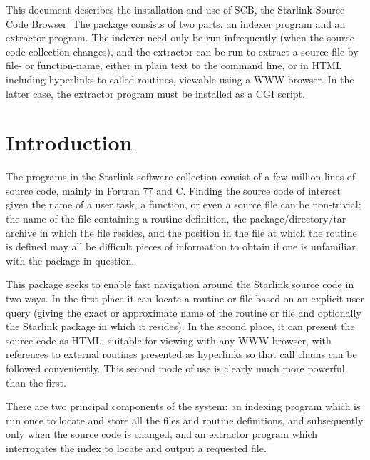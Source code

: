 \documentclass[twoside,11pt]{article}
\newcommand{\stardocinitials}  {SUN}
\newcommand{\stardocnumber}    {225.2}
\newcommand{\stardocabstract}  {
This document describes the installation and use of SCB,
the Starlink Source Code Browser.
The package consists of two parts, an indexer program and an
extractor program.
The indexer need only be run infrequently (when the source code collection
changes), and the extractor can be run to extract a source file
by file- or function-name, either in plain text to the command line,
or in HTML including hyperlinks to called routines, viewable
using a WWW browser.  In the latter case, the extractor program
must be installed as a CGI script.
}
\newcommand{\stardocname}{\stardocinitials /\stardocnumber}
\newenvironment{latexonly}{}{}
\newcommand{\xlabel}[1]{}
\renewcommand{\_}{\texttt{\symbol{95}}}
\renewcommand{\thepage}{\roman{page}}
\begin{document}
\stardocabstract
  \newpage
  \begin{latexonly}
    \setlength{\parskip}{0mm}
    \tableofcontents
    \setlength{\parskip}{\medskipamount}
    \markboth{\stardocname}{\stardocname}
  \end{latexonly}
\cleardoublepage
\renewcommand{\thepage}{\arabic{page}}
\setcounter{page}{1}


\section{\xlabel{sec:introduction}\label{sec:introduction}Introduction}

The programs in the Starlink software collection
consist of a few million lines of source code, mainly in
Fortran 77 and C.
Finding the source code of interest given the name of a
user task, a function, or even a source file can be non-trivial;
the name of the file containing a routine definition,
the package/directory/tar archive in which the file resides,
and the position in the file at which the routine is defined
may all be difficult pieces of information to obtain if one is
unfamiliar with the package in question.

This package seeks to enable fast navigation around the Starlink
source code in two ways.  In the first place it can locate a routine
or file based on an explicit user query (giving the exact or
approximate name of the routine or file and optionally the Starlink
package in which it resides).  In the second place, it can present
the source code as HTML, suitable for viewing with any WWW browser,
with references to external routines presented as hyperlinks so
that call chains can be followed conveniently.
This second mode of use is clearly much more powerful than the first.

There are two principal components of the system: an indexing program
which is run once to locate and store all the files and routine
definitions, and subsequently only when the source code is changed,
and an extractor program which interrogates the index to locate
and output a requested file.
\end{document}
